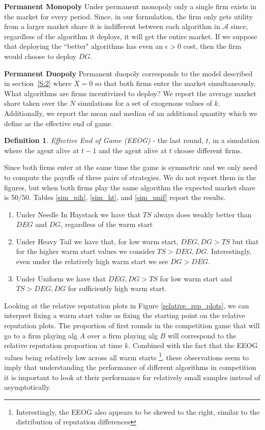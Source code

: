 \documentclass{article}
\theoremstyle{definition}
\newtheorem{definition}{Definition}
\begin{document}
\textbf{Permanent Monopoly} Under permanent monopoly only a single firm exists in the market for every period. Since, in our formulation, the firm only gets utility from a larger market share it is indifferent between each algorithm in $\mathcal{A}$ since, regardless of the algorithm it deploys, it will get the entire market. If we suppose that deploying the ``better" algorithms has even an $\epsilon > 0$ cost, then the firm would choose to deploy $DG$.

\textbf{Permanent Duopoly} Permanent duopoly corresponds to the model described in section~\ref{S:2} where $X = 0$ so that both firms enter the market simultaneously. What algorithms are firms incentivized to deploy? We report the average market share taken over the $N$ simulations for a set of exogenous values of $k$. Additionally, we report the mean and median of an additional quantity which we define as the effective end of game.

\begin{definition}
\textit{Effective End of Game (EEOG)} - the last round, $t$, in a simulation where the agent alive at $t-1$ and the agent alive at $t$ choose different firms.
\end{definition}

Since both firms enter at the same time the game is symmetric and we only need to compute the payoffs of three pairs of strategies. We do not report them in the figures, but when both firms play the same algorithm the expected market share is 50/50. Tables \ref{sim_nih}, \ref{sim_ht}, and \ref{sim_unif} report the results.
\begin{enumerate}
\item Under Needle In Haystack we have that $TS$ always does weakly better than $DEG$ and $DG$, regardless of the warm start
\item Under Heavy Tail we have that, for low warm start, $DEG, DG > TS$ but that for the higher warm start values we consider $TS > DEG, DG$. Interestingly, even under the relatively high warm start we see $DG > DEG$.
\item Under Uniform we have that $DEG, DG > TS$ for low warm start and $TS > DEG, DG$ for sufficiently high warm start.
\end{enumerate}

Looking at the relative reputation plots in Figure \ref{relative_rep_plots}, we can interpret fixing a warm start value as fixing the starting point on the relative reputation plots. The proportion of first rounds in the competition game that will go to a firm playing alg $A$ over a firm playing alg $B$ will correspond to the relative reputation proportion at time $k$. Combined with the fact that the EEOG values being relatively low across all warm starts \footnote{Interestingly, the EEOG also appears to be skewed to the right, similar to the distribution of reputation differences}, these observations seem to imply that understanding the performance of different algorithms in competition it is important to look at their performance for relatively small samples instead of asymptotically.
\end{document}
